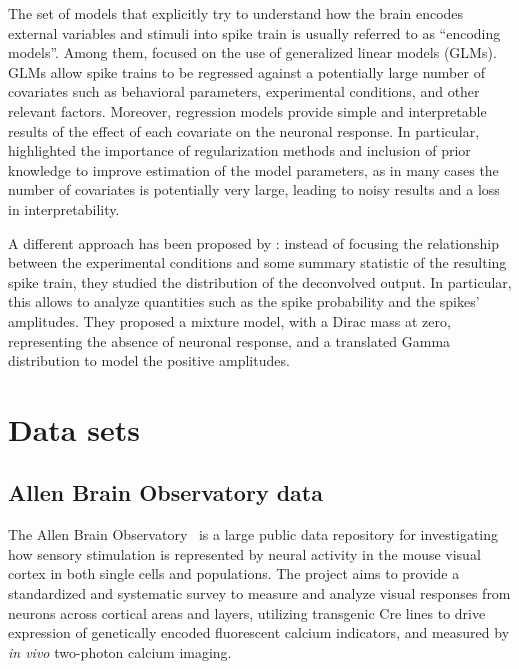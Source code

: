 The set of models that explicitly try to understand how the brain encodes external variables and stimuli into spike train is usually referred to as ``encoding models''. Among them, \textcite{paninski2007} focused on the use of generalized linear models (GLMs). GLMs allow spike trains to be regressed against a potentially large number of covariates such as behavioral parameters, experimental conditions, and other relevant factors.
Moreover, regression models provide simple and interpretable results of the effect of each covariate on the neuronal response.
In particular, \textcite{paninski2007} highlighted the importance of regularization methods and inclusion of prior knowledge to improve estimation of the model parameters, as in many cases the number of covariates is potentially very large, leading to noisy results and a loss in interpretability.

A different approach has been proposed by \textcite{wei2019}: instead of focusing the relationship between the experimental conditions and some summary statistic of the resulting spike train, they studied the distribution of the deconvolved output. In particular, this allows to analyze quantities such as the spike probability and the spikes' amplitudes. They proposed a mixture model, with a Dirac mass at zero, representing the absence of neuronal response, and a translated Gamma distribution to model the positive amplitudes.

\section{Data sets} 

\subsection{Allen Brain Observatory data}
\label{ch1_sec:allen_brain_data}
The Allen Brain Observatory~\parencite{allen, vries2020} is a large public data repository for investigating how sensory stimulation is represented by neural activity in the mouse visual cortex in both single cells and populations.
The project aims to provide a standardized and systematic survey to measure and analyze visual responses from neurons across cortical areas and layers, utilizing transgenic Cre lines to drive expression of genetically encoded fluorescent calcium indicators, and measured by \textit{in vivo} two-photon calcium imaging.

